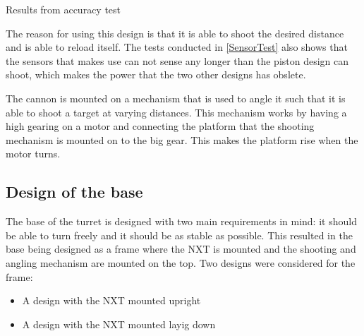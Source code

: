 \begin{graphEnv}
\begin{graphFloat}
\caption{Results from accuracy test}
\end{graphFloat}
\label{graph:Accuracy}
\end{graphEnv}

The reason for using this design is that it is able to shoot the desired
distance and is able to reload itself. The tests conducted in
\autoref{SensorTest} also shows that the sensors that \name makes use can not
sense any longer than the piston design can shoot, which makes the power that
the two other designs has obslete.\nl

The cannon is mounted on a mechanism that is used to angle it such that it
is able to shoot a target at varying distances. This mechanism works by having a
high gearing on a motor and connecting the platform that the shooting mechanism
is mounted on to the big gear. This makes the platform rise when the motor
turns.

\subsection{Design of the base}
The base of the turret is designed with two main requirements in mind: it should
be able to turn freely and it should be as stable as possible. This resulted
in the base being designed as a frame where the NXT is mounted and the shooting
and angling mechanism are mounted on the top. Two designs were considered for the frame: 

\begin{itemize}
  \item A design with the NXT mounted upright
  \item A design with the NXT mounted layig down
\end{itemize}

